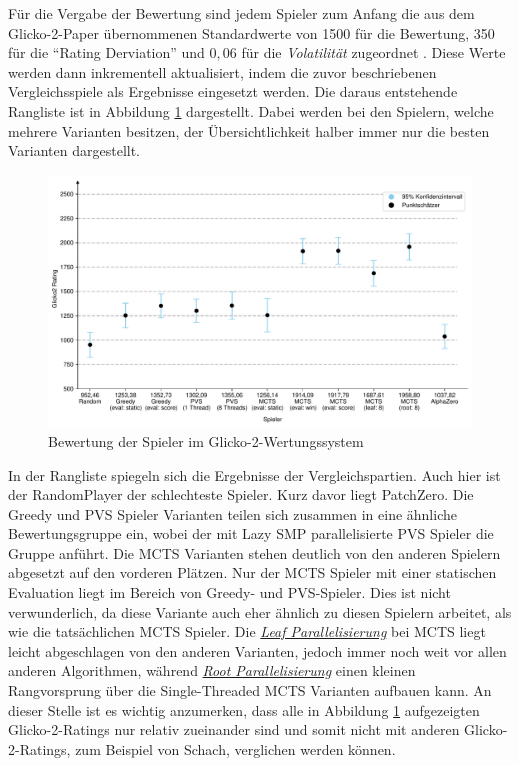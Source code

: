 Für die Vergabe der Bewertung sind jedem Spieler zum Anfang die aus dem Glicko-2-Paper übernommenen Standardwerte von 1500 für die Bewertung, 350 für die \enquote{Rating Derviation} und $0{,}06$ für die \emph{Volatilität} zugeordnet \cite[S. 2]{2022.Glicko2}. Diese Werte werden dann inkrementell aktualisiert, indem die zuvor beschriebenen Vergleichsspiele als Ergebnisse eingesetzt werden. Die daraus entstehende Rangliste ist in Abbildung \ref{fig:player-ratings} dargestellt. Dabei werden bei den Spielern, welche mehrere Varianten besitzen, der Übersichtlichkeit halber immer nur die besten Varianten dargestellt.

\begin{figure}[!ht]
    \centering
    \includegraphics[width=\textwidth]{res/pictures/plots/player-ratings.pdf}
    \caption{Bewertung der Spieler im Glicko-2-Wertungssystem}
    \label{fig:player-ratings}
\end{figure}

In der Rangliste spiegeln sich die Ergebnisse der Vergleichspartien. Auch hier ist der RandomPlayer der schlechteste Spieler. Kurz davor liegt PatchZero. Die Greedy und \ac{PVS} Spieler Varianten teilen sich zusammen in eine ähnliche Bewertungsgruppe ein, wobei der mit Lazy \ac{SMP} parallelisierte \ac{PVS} Spieler die Gruppe anführt. Die \ac{MCTS} Varianten stehen deutlich von den anderen Spielern abgesetzt auf den vorderen Plätzen. Nur der \ac{MCTS} Spieler mit einer statischen Evaluation liegt im Bereich von Greedy- und \ac{PVS}-Spieler. Dies ist nicht verwunderlich, da diese Variante auch eher ähnlich zu diesen Spielern arbeitet, als wie die tatsächlichen \ac{MCTS} Spieler. Die \hyperref[text:leaf-parallelization]{\emph{Leaf Parallelisierung}} bei \ac{MCTS} liegt leicht abgeschlagen von den anderen Varianten, jedoch immer noch weit vor allen anderen Algorithmen, während \hyperref[text:root-parallelization]{\emph{Root Parallelisierung}} einen kleinen Rangvorsprung über die Single-Threaded \ac{MCTS} Varianten aufbauen kann. An dieser Stelle ist es wichtig anzumerken, dass alle in Abbildung \ref{fig:player-ratings} aufgezeigten Glicko-2-Ratings nur relativ zueinander sind und somit nicht mit anderen Glicko-2-Ratings, zum Beispiel von Schach, verglichen werden können.


